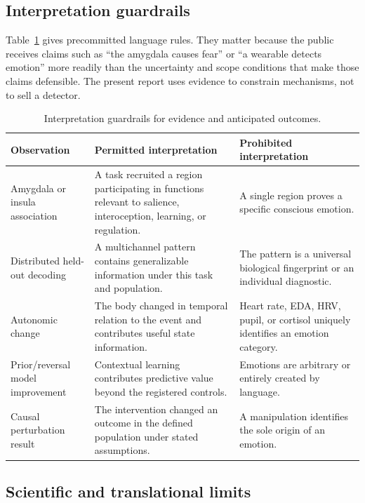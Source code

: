 \documentclass[conference]{IEEEtran}
\begin{document}
\subsection{Interpretation guardrails}

Table~\ref{tab:guardrails} gives precommitted language rules. They matter because the public receives claims such as ``the amygdala causes fear'' or ``a wearable detects emotion'' more readily than the uncertainty and scope conditions that make those claims defensible. The present report uses evidence to constrain mechanisms, not to sell a detector.

\begin{table}[!t]
\caption{Interpretation guardrails for evidence and anticipated outcomes.}\label{tab:guardrails}
\centering
\footnotesize
\begin{tabular}{p{}p{}p{}}
\toprule
Observation & Permitted interpretation & Prohibited interpretation \\
\midrule
Amygdala or insula association & A task recruited a region participating in functions relevant to salience, interoception, learning, or regulation. & A single region proves a specific conscious emotion. \\
Distributed held-out decoding & A multichannel pattern contains generalizable information under this task and population. & The pattern is a universal biological fingerprint or an individual diagnostic. \\
Autonomic change & The body changed in temporal relation to the event and contributes useful state information. & Heart rate, EDA, HRV, pupil, or cortisol uniquely identifies an emotion category. \\
Prior/reversal model improvement & Contextual learning contributes predictive value beyond the registered controls. & Emotions are arbitrary or entirely created by language. \\
Causal perturbation result & The intervention changed an outcome in the defined population under stated assumptions. & A manipulation identifies the sole origin of an emotion. \\
\bottomrule
\end{tabular}
\end{table}

\subsection{Scientific and translational limits}
\end{document}

